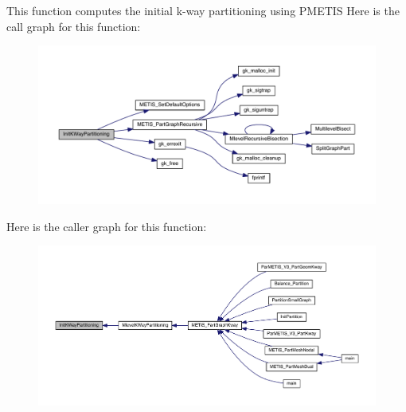 This function computes the initial k-\/way partitioning using P\+M\+E\+T\+IS Here is the call graph for this function\+:\nopagebreak
\begin{figure}[H]
\begin{center}
\leavevmode
\includegraphics[width=350pt]{a00909_a870e37cc14eb1033c62d83d3a7c33a91_cgraph}
\end{center}
\end{figure}
Here is the caller graph for this function\+:\nopagebreak
\begin{figure}[H]
\begin{center}
\leavevmode
\includegraphics[width=350pt]{a00909_a870e37cc14eb1033c62d83d3a7c33a91_icgraph}
\end{center}
\end{figure}
\mbox{\label{a00909_af89851458c047aba436b36ed567441e4}} 
